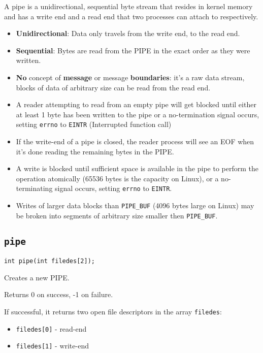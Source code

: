 \documentclass{article}
\begin{document}
A pipe is a unidirectional, sequential byte stream that resides in kernel memory and has a write end and a read end that two processes can attach to respectively.

\begin{itemize}
    \item \textbf{Unidirectional}: Data only travels from the write end, to the read end.
    \item \textbf{Sequential}: Bytes are read from the PIPE in the exact order as they were written.
    \item \textbf{No} concept of \textbf{message} or message \textbf{boundaries}: it's a raw data stream, blocks of data of arbitrary size can be read from the read end.
    \item A reader attempting to read from an empty pipe will get blocked until either at least 1 byte has been written to the pipe or a no-termination signal occurs, setting \texttt{errno} to \texttt{EINTR} (Interrupted function call)
    \item If the write-end of a pipe is closed, the reader process will see an EOF when it's done reading the remaining bytes in the PIPE.
    \item A write is blocked until sufficient space is available in the pipe to perform the operation atomically (65536 bytes is the capacity on Linux), or a no-terminating signal occurs, setting \texttt{errno} to \texttt{EINTR}.
    \item Writes of larger data blocks than \texttt{PIPE\_BUF} (4096 bytes large on Linux) may be broken into segments of arbitrary size smaller then \texttt{PIPE\_BUF}.
\end{itemize}


\subsection{\texttt{pipe}}

\begin{verbatim}
int pipe(int filedes[2]);
\end{verbatim}

Creates a new PIPE.

Returns 0 on success, -1 on failure.

If successful, it returns two open file descriptors in the array \texttt{filedes}:

\begin{itemize}
    \item \texttt{filedes[0]} - read-end
    \item \texttt{filedes[1]} - write-end
\end{itemize}
\end{document}
